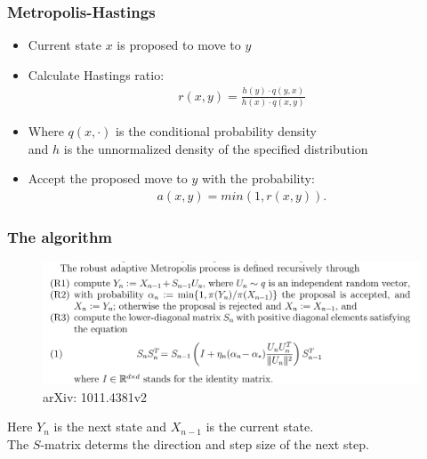 \documentclass{beamer}
\begin{document}



\begin{frame}
 \frametitle{Metropolis-Hastings}
 \begin{itemize}
  \item Current state $x$ is proposed to move to $y$
  \item Calculate Hastings ratio: \\
        \begin{align}
         r(x,y) = \frac{h(y) \cdot q(y,x)} {h(x) \cdot q(x,y)} \label{eq:r(x,y)}
        \end{align}
  \item Where $q(x,\cdot)$ is the conditional probability density \\
        and $h$ is the unnormalized density of the specified distribution
  \item Accept the proposed move to $y$ with the probability: \\
        \begin{align}
         a(x,y) = min(1,r(x,y)).
        \end{align}
 \end{itemize}
\end{frame}


\begin{frame}
 \frametitle{The algorithm}
 \begin{figure}
  \includegraphics[width=1.0\linewidth]{figures/Metropolis}
  \caption{arXiv: 1011.4381v2}
 \end{figure}
 Here $Y_n$ is the next state and $X_{n-1}$ is the current state. \\
 The $S$-matrix determs the direction and step size of the next step. \\
\end{frame}
\end{document}
